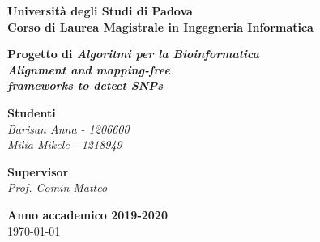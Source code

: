 \documentclass[11pt]{article}
\theoremstyle{definition}
\begin{document}
\begin{titlepage}
   \begin{center}
       	\vspace*{1cm}

	   	\textbf{\Large Università degli Studi di Padova\\}
	   	\vspace{0.2cm}
		\textbf{\Large Corso di Laurea Magistrale in Ingegneria Informatica}

		\vspace{5cm}
		\textbf{\huge Progetto di \textit{Algoritmi per la Bioinformatica}\\}
		\vspace{0.5cm}
      	\textbf{\huge \textit{Alignment and mapping-free \\}}
      	\vspace{0.2cm}
		\textbf{\huge \textit{frameworks to detect SNPs}}     
		 	
       	\vspace{6.3cm}

		\begin{Large}
			\begin{flushright}
				\textbf{Studenti\\}
				\textit{Barisan Anna - 1206600\\ Milia Mikele - 1218949}
			\end{flushright}
		\end{Large}
		
       \begin{Large}
			\begin{flushleft}
				\textbf{Supervisor\\}
				\textit{Prof. Comin Matteo}
			\end{flushleft}
		\end{Large}

       \vfill
       \vspace{0.5cm}
            
       \textbf{Anno accademico 2019-2020}\\
       \today
       

\end{center}
\end{titlepage}
\end{document}
